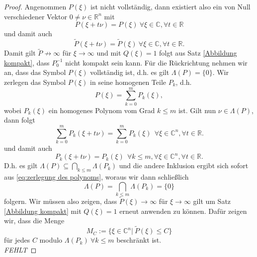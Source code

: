 \begin{proof}
Angenommen $P(\xi)$ ist nicht vollständig, dann existiert also ein von Null verschiedener Vektor $0 \not = \nu \in \mathbb{R}^n$ mit
\begin{equation}
P(\xi + t \nu)  = P(\xi) \ \forall \xi \in \mathbb{C}, \forall t \in \mathbb{R}
\end{equation}
und damit auch 
\begin{equation}
\tilde{P}(\xi + t \nu) = \tilde{P}(\xi) \ \forall \xi \in \mathbb{C}, \forall t \in \mathbb{R}.
\end{equation}
Damit gilt  $\tilde{P} \not \rightarrow \infty$ für $\xi \rightarrow \infty$ und mit $Q(\xi) = 1$ folgt aus Satz \ref{Abbildung kompakt}, dass $P_0^{-1}$ nicht kompakt sein kann. Für die Rückrichtung nehmen wir an, dass das Symbol $P(\xi)$ vollständig ist, d.h. es gilt $\Lambda (P)= \{0\}$. Wir zerlegen das Symbol $P(\xi)$ in seine homogenen Teile $P_k$, d.h.
\begin{equation}\label{eq:zerlegung des polynoms}
P(\xi) = \sum_{k=0}^m P_k(\xi),
\end{equation}
wobei $P_k(\xi)$ ein homogenes Polynom vom Grad $k \leq m$ ist.
Gilt nun $\nu \in \Lambda (P)$, dann folgt
\begin{equation}
\sum_{k=0}^m P_k (\xi + t \nu) = \sum_{k=0}^m P_k (\xi) \ \  \forall \xi \in \mathbb{C}^n, \forall t \in \mathbb{R}.
\end{equation}
und damit auch
\begin{equation}
P_k (\xi + t \nu) = P_k (\xi) \ \ \forall k \leq m,  \forall \xi \in \mathbb{C}^n, \forall t \in \mathbb{R}.
\end{equation}
D.h. es gilt $\Lambda(P) \subseteq \bigcap_{k \leq m} \Lambda (P_k)$ und die andere Inklusion ergibt sich sofort aus \eqref{eq:zerlegung des polynoms}, woraus wir dann schließlich
\begin{equation}\label{eq:schnitt der homogenen teile}
\Lambda(P) = \bigcap_{k \leq m} \Lambda (P_k) = \{0\}
\end{equation}
folgern. Wir müssen also zeigen, dass $\tilde{P}(\xi) \rightarrow \infty$ für $\xi \rightarrow \infty$ gilt um Satz \ref{Abbildung kompakt} mit $Q(\xi) =1$ erneut anwenden zu können. Dafür zeigen wir, dass die Menge
\begin{equation}
M_C := \{\xi \in \mathbb{C}^n | \ \tilde{P}(\xi) \leq C\}
\end{equation}
für jedes $C$ modulo ${\Lambda(P_k)} \ \forall k \leq m$ beschränkt ist.
\\ \textit{FEHLT} %
\end{proof}

